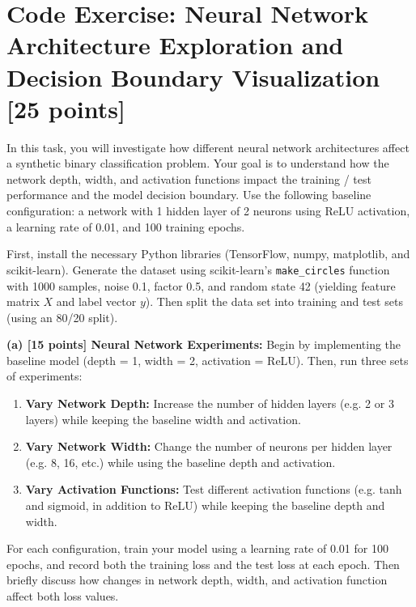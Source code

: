 \documentclass[11pt]{article}
\begin{document}
\section{Code Exercise: Neural Network Architecture Exploration and Decision Boundary Visualization [25 points]}

In this task, you will investigate how different neural network architectures affect a synthetic binary classification problem. Your goal is to understand how the network depth, width, and activation functions impact the training / test performance and the model decision boundary. Use the following baseline configuration: a network with 1 hidden layer of 2 neurons using ReLU activation, a learning rate of 0.01, and 100 training epochs.

First, install the necessary Python libraries (TensorFlow, numpy, matplotlib, and scikit-learn). Generate the dataset using scikit-learn’s \texttt{make\_circles} function with 1000 samples, noise 0.1, factor 0.5, and random state 42 (yielding feature matrix $X$ and label vector $y$). Then split the data set into training and test sets (using an 80/20 split).

\vspace{0.1in}
\noindent\textbf{(a) [15 points] Neural Network Experiments:} 
Begin by implementing the baseline model (depth = 1, width = 2, activation = ReLU). Then, run three sets of experiments:
\begin{enumerate}
    \item \textbf{Vary Network Depth:} Increase the number of hidden layers (e.g. 2 or 3 layers) while keeping the baseline width and activation.
    \item \textbf{Vary Network Width:} Change the number of neurons per hidden layer (e.g. 8, 16, etc.) while using the baseline depth and activation.
    \item \textbf{Vary Activation Functions:} Test different activation functions (e.g. tanh and sigmoid, in addition to ReLU) while keeping the baseline depth and width.
\end{enumerate}
For each configuration, train your model using a learning rate of 0.01 for 100 epochs, and record both the training loss and the test loss at each epoch. Then briefly discuss how changes in network depth, width, and activation function affect both loss values.
\end{document}
